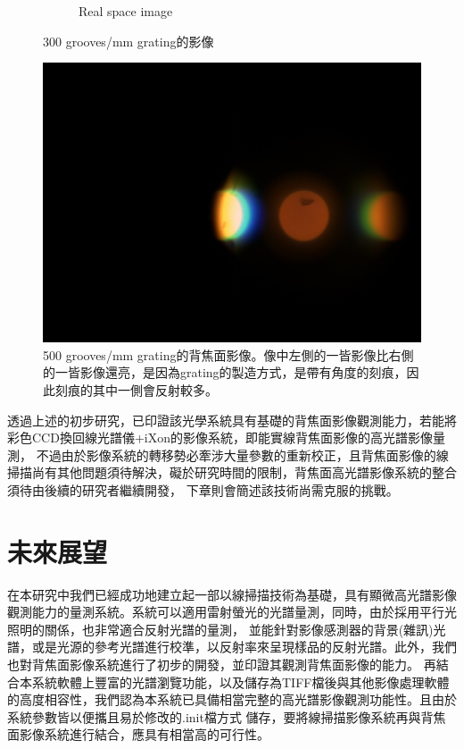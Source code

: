 \documentclass[12pt]{article}
\begin{document}
\begin{figure}[h]
\begin{subfigure}[b]{0.45\textwidth}
        \caption{Real space image}
        \label{fig: 300 real}
    \end{subfigure}
    \caption{300 grooves/mm grating的影像}
\end{figure}

\begin{figure}[h]
    \centering
    \includegraphics[width = 0.8\linewidth]{500bfp.jpeg}
    \caption[500 grooves/mm grating的背焦面影像]{500 grooves/mm grating的背焦面影像。像中左側的一皆影像比右側的一皆影像還亮，是因為grating的製造方式，是帶有角度的刻痕，因此刻痕的其中一側會反射較多。}
    \label{fig: 500 bfp}
\end{figure}

透過上述的初步研究，已印證該光學系統具有基礎的背焦面影像觀測能力，若能將彩色CCD換回線光譜儀+iXon的影像系統，即能實線背焦面影像的高光譜影像量測，
不過由於影像系統的轉移勢必牽涉大量參數的重新校正，且背焦面影像的線掃描尚有其他問題須待解決，礙於研究時間的限制，背焦面高光譜影像系統的整合須待由後續的研究者繼續開發，
下章則會簡述該技術尚需克服的挑戰。

\section{未來展望}
在本研究中我們已經成功地建立起一部以線掃描技術為基礎，具有顯微高光譜影像觀測能力的量測系統。系統可以適用雷射螢光的光譜量測，同時，由於採用平行光照明的關係，也非常適合反射光譜的量測，
並能針對影像感測器的背景(雜訊)光譜，或是光源的參考光譜進行校準，以反射率來呈現樣品的反射光譜。此外，我們也對背焦面影像系統進行了初步的開發，並印證其觀測背焦面影像的能力。
再結合本系統軟體上豐富的光譜瀏覽功能，以及儲存為TIFF檔後與其他影像處理軟體的高度相容性，我們認為本系統已具備相當完整的高光譜影像觀測功能性。且由於系統參數皆以便攜且易於修改的.init檔方式
儲存，要將線掃描影像系統再與背焦面影像系統進行結合，應具有相當高的可行性。
\end{document}
